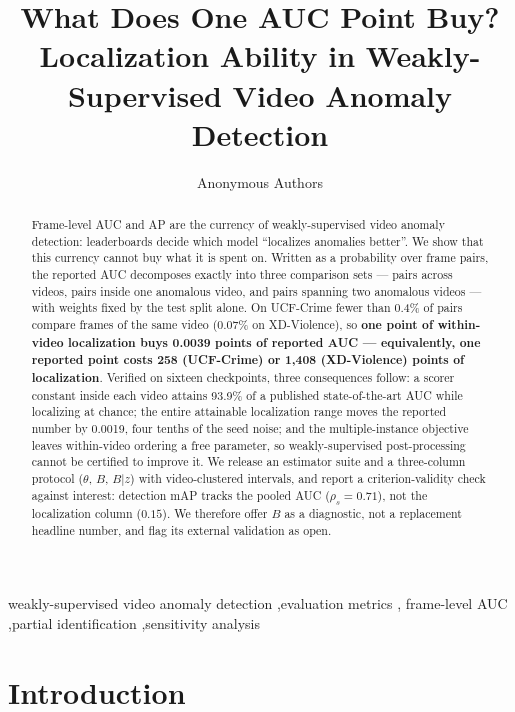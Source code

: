 \documentclass[number,preprint,12pt]{elsarticle}
\begin{document}
\begin{frontmatter}

\title{What Does One AUC Point Buy? \\ \large Localization Ability in Weakly-Supervised Video Anomaly Detection}

\author{Anonymous Authors}
\address{Manuscript under review}

\begin{abstract}
\label{abstract}

Frame-level AUC and AP are the currency of weakly-supervised video anomaly
detection: leaderboards decide which model ``localizes anomalies better''. We
show that this currency cannot buy what it is spent on. Written as a
probability over frame pairs, the reported AUC decomposes exactly into three
comparison sets --- pairs across videos, pairs inside one anomalous video, and
pairs spanning two anomalous videos --- with weights fixed by the test split
alone. On UCF-Crime fewer than 0.4\% of pairs compare frames of the same video
(0.07\% on XD-Violence), so \textbf{one point of within-video localization buys
0.0039 points of reported AUC --- equivalently, one reported point costs 258
(UCF-Crime) or 1,408 (XD-Violence) points of localization}. Verified on
sixteen checkpoints, three consequences follow: a scorer constant inside each
video attains 93.9\% of a published state-of-the-art AUC while localizing at
chance; the entire attainable localization range moves the reported number by
0.0019, four tenths of the seed noise; and the multiple-instance objective
leaves within-video ordering a free parameter, so weakly-supervised
post-processing cannot be certified to improve it. We release an estimator
suite and a three-column protocol (\(\theta\), \(B\), \(B|z\)) with video-clustered
intervals, and report a criterion-validity check against interest: detection
mAP tracks the pooled AUC (\(\rho_s=0.71\)), not the localization column
(\(0.15\)). We therefore offer \(B\) as a diagnostic, not a replacement headline
number, and flag its external validation as open.
\end{abstract}

\begin{keyword}
weakly-supervised video anomaly detection \sep evaluation metrics \sep
frame-level AUC \sep partial identification \sep sensitivity analysis
\end{keyword}

\end{frontmatter}

\section{Introduction}\label{introduction}
\end{document}
